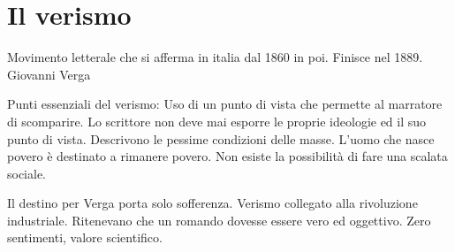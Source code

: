 \documentclass{article}
\begin{document}
    \section{Il verismo}
    Movimento letterale che si afferma in italia dal 1860 in poi. Finisce nel 1889.
    Giovanni Verga

    Punti essenziali del verismo:
    Uso di un punto di vista che permette al marratore di scomparire. Lo scrittore non deve mai esporre le proprie ideologie ed
    il suo punto di vista. Descrivono le pessime condizioni delle masse. L'uomo che nasce povero è destinato a rimanere
    povero. Non esiste la possibilità di fare una scalata sociale.

    Il destino per Verga porta solo sofferenza.
    Verismo collegato alla rivoluzione industriale.
    Ritenevano che un romando dovesse essere vero ed oggettivo.
    Zero sentimenti, valore scientifico.
\end{document}
